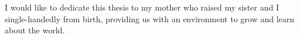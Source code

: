 
\begin{dedication}

I would like to dedicate this thesis to my mother who raised my sister and I single-handedly from birth, providing us with an environment
to grow and learn about the world.

\end{dedication}

